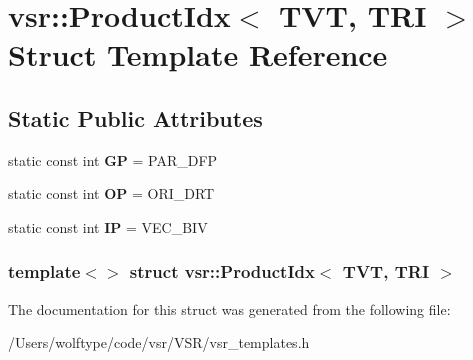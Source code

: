 \hypertarget{structvsr_1_1_product_idx_3_01_t_v_t_00_01_t_r_i_01_4}{\section{vsr\-:\-:Product\-Idx$<$ T\-V\-T, T\-R\-I $>$ Struct Template Reference}
\label{structvsr_1_1_product_idx_3_01_t_v_t_00_01_t_r_i_01_4}
}
\subsection*{Static Public Attributes}
\begin{DoxyCompactItemize}
\item 
\hypertarget{structvsr_1_1_product_idx_3_01_t_v_t_00_01_t_r_i_01_4_ae0e0ca090f5d38727557a21f3dc5a6bd}{static const int {\bfseries G\-P} = P\-A\-R\-\_\-\-D\-F\-P}\label{structvsr_1_1_product_idx_3_01_t_v_t_00_01_t_r_i_01_4_ae0e0ca090f5d38727557a21f3dc5a6bd}

\item 
\hypertarget{structvsr_1_1_product_idx_3_01_t_v_t_00_01_t_r_i_01_4_a3f6d5851cf04889493d0622e47b6a0b1}{static const int {\bfseries O\-P} = O\-R\-I\-\_\-\-D\-R\-T}\label{structvsr_1_1_product_idx_3_01_t_v_t_00_01_t_r_i_01_4_a3f6d5851cf04889493d0622e47b6a0b1}

\item 
\hypertarget{structvsr_1_1_product_idx_3_01_t_v_t_00_01_t_r_i_01_4_a26f6a890430cad6e161ce1feef4c8164}{static const int {\bfseries I\-P} = V\-E\-C\-\_\-\-B\-I\-V}\label{structvsr_1_1_product_idx_3_01_t_v_t_00_01_t_r_i_01_4_a26f6a890430cad6e161ce1feef4c8164}

\end{DoxyCompactItemize}
\subsubsection*{template$<$$>$ struct vsr\-::\-Product\-Idx$<$ T\-V\-T, T\-R\-I $>$}



The documentation for this struct was generated from the following file\-:\begin{DoxyCompactItemize}
\item 
/\-Users/wolftype/code/vsr/\-V\-S\-R/vsr\-\_\-templates.\-h\end{DoxyCompactItemize}
